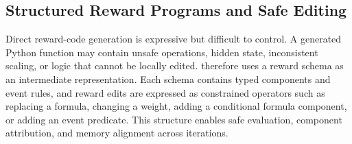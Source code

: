 \subsection{Structured Reward Programs and Safe Editing}

Direct reward-code generation is expressive but difficult to control. A generated Python function may contain unsafe operations, hidden state, inconsistent scaling, or logic that cannot be locally edited. \methodname{} therefore uses a reward schema as an intermediate representation. Each schema contains typed components and event rules, and reward edits are expressed as constrained operators such as replacing a formula, changing a weight, adding a conditional formula component, or adding an event predicate. This structure enables safe evaluation, component attribution, and memory alignment across iterations.

